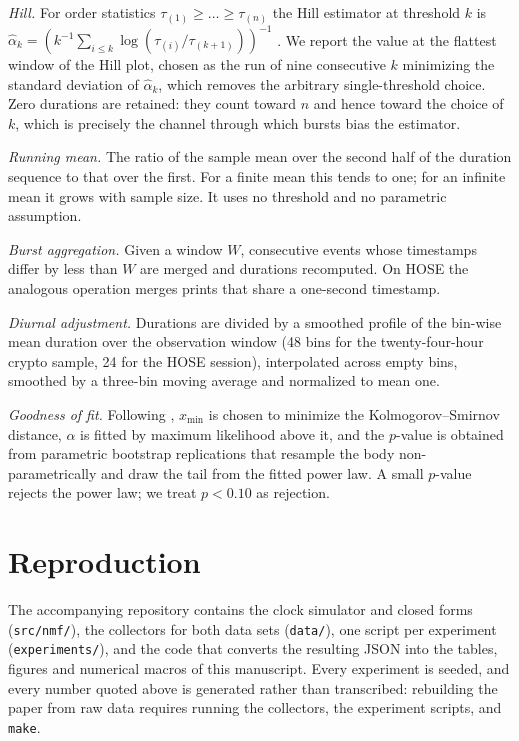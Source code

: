 \documentclass{ws-ijtaf}
\begin{document}
\emph{Hill.} For order statistics $\tau_{(1)}\ge\dots\ge\tau_{(n)}$ the Hill
estimator at threshold $k$ is
$\hat\alpha_k = (k^{-1}\sum_{i\le k}\log(\tau_{(i)}/\tau_{(k+1)}))^{-1}$
\citep{hil75}. We report the value at the flattest window of the Hill plot,
chosen as the run of nine consecutive $k$ minimizing the standard deviation of
$\hat\alpha_k$, which removes the arbitrary single-threshold choice. Zero
durations are retained: they count toward $n$ and hence toward the choice of
$k$, which is precisely the channel through which bursts bias the estimator.

\emph{Running mean.} The ratio of the sample mean over the second half of the
duration sequence to that over the first. For a finite mean this tends to one;
for an infinite mean it grows with sample size. It uses no threshold and no
parametric assumption.

\emph{Burst aggregation.} Given a window $W$, consecutive events whose
timestamps differ by less than $W$ are merged and durations recomputed. On HOSE
the analogous operation merges prints that share a one-second timestamp.

\emph{Diurnal adjustment.} Durations are divided by a smoothed profile of the
bin-wise mean duration over the observation window (48 bins for the
twenty-four-hour crypto sample, 24 for the HOSE session), interpolated across
empty bins, smoothed by a three-bin moving average and normalized to mean one.

\emph{Goodness of fit.} Following \citet{cla09}, $x_{\min}$ is chosen to
minimize the Kolmogorov--Smirnov distance, $\alpha$ is fitted by maximum
likelihood above it, and the $p$-value is obtained from parametric bootstrap
replications that resample the body non-parametrically and draw the tail from
the fitted power law. A small $p$-value rejects the power law; we treat
$p<0.10$ as rejection.

\section{Reproduction}\label{app:repro}

The accompanying repository contains the clock simulator and closed forms
(\texttt{src/nmf/}), the collectors for both data sets (\texttt{data/}), one
script per experiment (\texttt{experiments/}), and the code that converts the
resulting JSON into the tables, figures and numerical macros of this manuscript.
Every experiment is seeded, and every number quoted above is generated rather
than transcribed: rebuilding the paper from raw data requires running the
collectors, the experiment scripts, and \texttt{make}.
\end{document}
